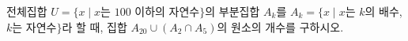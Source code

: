 전체집합 $U=\{x \mid x$는 $100$ 이하의 자연수$\}$의 부분집합 $A_k$를 $A_k=\{x \mid x$는 $k$의 배수, $k$는 자연수$\}$라 할 때, 집합 $A_{20}\cup(A_2\cap A_5)$의 원소의 개수를 구하시오.
